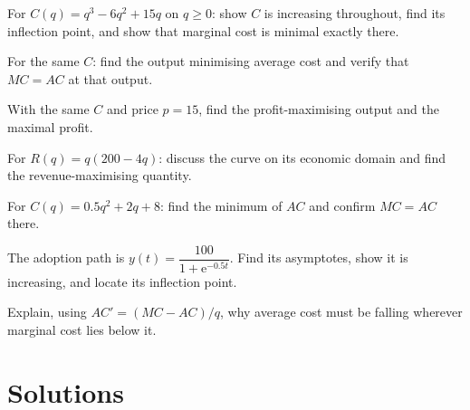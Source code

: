 \begin{problems}[resume]
  \item For $C(q)=q^{3}-6q^{2}+15q$ on $q\ge0$: show $C$ is increasing
        throughout, find its inflection point, and show that marginal cost
        is minimal exactly there.
  \item For the same $C$: find the output minimising average cost and
        verify that $MC=AC$ at that output.
  \item With the same $C$ and price $p=15$, find the profit-maximising
        output and the maximal profit.
  \item For $R(q)=q(200-4q)$: discuss the curve on its economic domain and
        find the revenue-maximising quantity.
  \item For $C(q)=0.5q^{2}+2q+8$: find the minimum of $AC$ and confirm
        $MC=AC$ there.
  \item The adoption path is $y(t)=\dfrac{100}{1+\mathrm{e}^{-0.5t}}$.
        Find its asymptotes, show it is increasing, and locate its
        inflection point.
  \item Explain, using $AC'=(MC-AC)/q$, why average cost must be falling
        wherever marginal cost lies below it.
\end{problems}

\section{Solutions}

